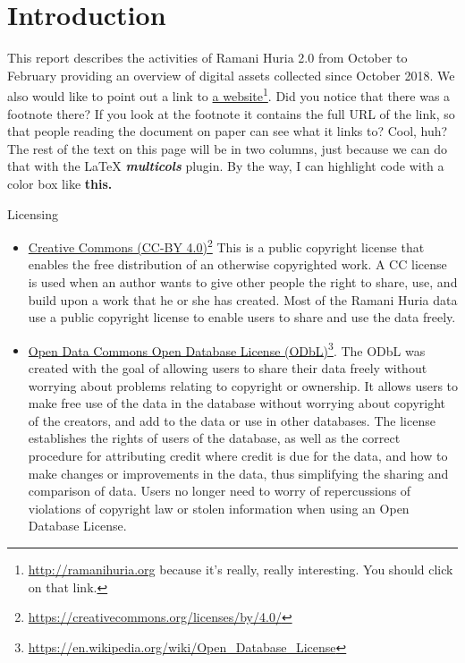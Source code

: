 \documentclass[a4paper,12pt,twoside]{article}
\begin{document}

\newpage
\section{Introduction}
\label{Introduction}

 This report describes the activities of Ramani Huria 2.0 from October to February providing an overview of digital assets collected since October 2018. 
\bigskip
We also would like to point out a link to  \href{https://ramanihuria.org}{a website}\footnote{\url{http://ramanihuria.org}\color{RHgrey} { }because it's really, really interesting. You should click on that link.}. Did you notice that there was a footnote there? If you look at the footnote it contains the full URL of the link, so that people reading the document on paper can see what it links to? Cool, huh? The rest of the text on this page will be in two columns, just because we can do that with the \LaTeX{} \textbf{\textit{multicols}} plugin. By the way, I can highlight code with a color box like \textbf{\colorbox{code}{this.}}


\newpage
{\color{RHblue}\Large{Licensing}}
\begin{itemize}
    \item
    \href{https://creativecommons.org/licenses/by/4.0/}{Creative Commons (CC-BY 4.0)}\footnote{\url{https://creativecommons.org/licenses/by/4.0/}}
This is a public copyright license that enables the free distribution of an otherwise copyrighted work. A CC license is used when an author wants to give other people the right to share, use, and build upon a work that he or she has created. Most of the Ramani Huria data use a public copyright license to enable users to share and use the data freely.
\item 
\href{https://en.wikipedia.org/wiki/Open_Database_License}{Open Data Commons Open Database License (ODbL)}\footnote{\url{https://en.wikipedia.org/wiki/Open_Database_License}}.
The ODbL was created with the goal of allowing users to share their data freely without worrying about problems relating to copyright or ownership. It allows users to make free use of the data in the database without worrying about copyright of the creators, and add to the data or use in other databases. The license establishes the rights of users of the database, as well as the correct procedure for attributing credit where credit is due for the data, and how to make changes or improvements in the data, thus simplifying the sharing and comparison of data. Users no longer need to worry of repercussions of violations of copyright law or stolen information when using an Open Database License.

\end{itemize}
\bigskip
\end{document}
